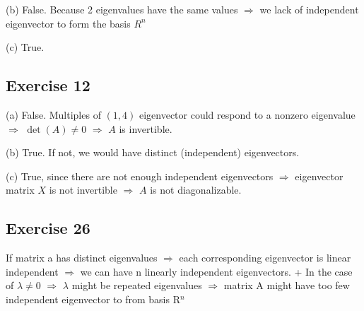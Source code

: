 \documentclass{article}
\begin{document}
(b) False. Because 2 eigenvalues have the same values $\Rightarrow$ we lack of independent eigenvector to form the basis $R^n$

(c) True.

\subsection{Exercise 12}
(a) False. Multiples of $(1,4)$ eigenvector could respond to a nonzero eigenvalue $\Rightarrow$ $\det(A) \neq 0$ $\Rightarrow$ $A$ is invertible.

(b) True. If not, we would have distinct (independent) eigenvectors.

(c) True, since there are not enough independent eigenvectors $\Rightarrow$ eigenvector matrix $X$ is not invertible $\Rightarrow$ $A$ is not diagonalizable.

\subsection{Exercise 26}
If matrix a has distinct eigenvalues $\Rightarrow$ each corresponding eigenvector is linear independent  $\Rightarrow$ we can have n linearly independent eigenvectors.
+ In the case of $\lambda \neq 0$ $\Rightarrow$ $\lambda$ might be repeated eigenvalues $\Rightarrow$ matrix A might have too few independent eigenvector to from basis R$^n$
\end{document}
